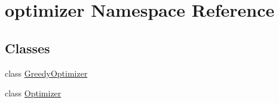 \hypertarget{namespaceoptimizer}{}\section{optimizer Namespace Reference}
\label{namespaceoptimizer}
\subsection*{Classes}
\begin{DoxyCompactItemize}
\item 
class \hyperlink{classoptimizer_1_1_greedy_optimizer}{Greedy\+Optimizer}
\item 
class \hyperlink{classoptimizer_1_1_optimizer}{Optimizer}
\end{DoxyCompactItemize}
